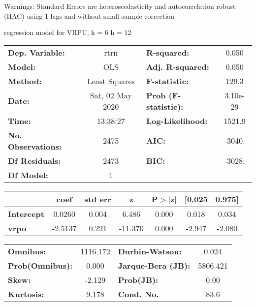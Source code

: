 Warnings: \newline
 [1] Standard Errors are heteroscedasticity and autocorrelation robust (HAC) using 1 lags and without small sample correction\ 

regression model for VRPU, k = 6 h = 12\begin{center}
\begin{tabular}{lclc}
\toprule
\textbf{Dep. Variable:}    &       rtrn       & \textbf{  R-squared:         } &     0.050   \\
\textbf{Model:}            &       OLS        & \textbf{  Adj. R-squared:    } &     0.050   \\
\textbf{Method:}           &  Least Squares   & \textbf{  F-statistic:       } &     129.3   \\
\textbf{Date:}             & Sat, 02 May 2020 & \textbf{  Prob (F-statistic):} &  3.10e-29   \\
\textbf{Time:}             &     13:38:27     & \textbf{  Log-Likelihood:    } &    1521.9   \\
\textbf{No. Observations:} &        2475      & \textbf{  AIC:               } &    -3040.   \\
\textbf{Df Residuals:}     &        2473      & \textbf{  BIC:               } &    -3028.   \\
\textbf{Df Model:}         &           1      & \textbf{                     } &             \\
\bottomrule
\end{tabular}
\begin{tabular}{lcccccc}
                   & \textbf{coef} & \textbf{std err} & \textbf{z} & \textbf{P$> |$z$|$} & \textbf{[0.025} & \textbf{0.975]}  \\
\midrule
\textbf{Intercept} &       0.0260  &        0.004     &     6.486  &         0.000        &        0.018    &        0.034     \\
\textbf{vrpu}      &      -2.5137  &        0.221     &   -11.370  &         0.000        &       -2.947    &       -2.080     \\
\bottomrule
\end{tabular}
\begin{tabular}{lclc}
\textbf{Omnibus:}       & 1116.172 & \textbf{  Durbin-Watson:     } &    0.024  \\
\textbf{Prob(Omnibus):} &   0.000  & \textbf{  Jarque-Bera (JB):  } & 5806.421  \\
\textbf{Skew:}          &  -2.129  & \textbf{  Prob(JB):          } &     0.00  \\
\textbf{Kurtosis:}      &   9.178  & \textbf{  Cond. No.          } &     83.6  \\
\bottomrule
\end{tabular}
\end{center}

